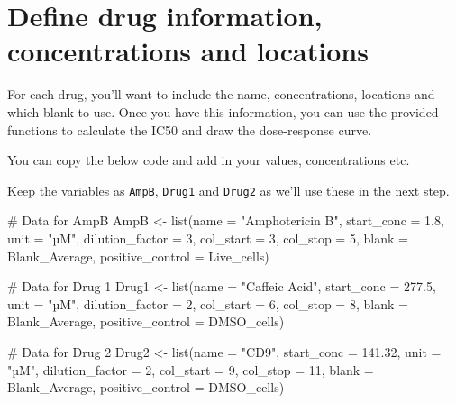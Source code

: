 \documentclass[
  letterpaper,
  DIV=11,
  numbers=noendperiod]{scrreprt}
\newenvironment{Shaded}{\begin{snugshade}}{\end{snugshade}}
\newcommand{\AttributeTok}[1]{\textcolor[rgb]{0.40,0.45,0.13}{#1}}
\newcommand{\CommentTok}[1]{\textcolor[rgb]{0.37,0.37,0.37}{#1}}
\newcommand{\DecValTok}[1]{\textcolor[rgb]{0.68,0.00,0.00}{#1}}
\newcommand{\FloatTok}[1]{\textcolor[rgb]{0.68,0.00,0.00}{#1}}
\newcommand{\FunctionTok}[1]{\textcolor[rgb]{0.28,0.35,0.67}{#1}}
\newcommand{\NormalTok}[1]{\textcolor[rgb]{0.00,0.23,0.31}{#1}}
\newcommand{\OtherTok}[1]{\textcolor[rgb]{0.00,0.23,0.31}{#1}}
\newcommand{\StringTok}[1]{\textcolor[rgb]{0.13,0.47,0.30}{#1}}
\begin{document}

\chapter{Define drug information, concentrations and
locations}\label{define-drug-information-concentrations-and-locations}

For each drug, you'll want to include the name, concentrations,
locations and which blank to use. Once you have this information, you
can use the provided functions to calculate the IC50 and draw the
dose-response curve.

You can copy the below code and add in your values, concentrations etc.

Keep the variables as \texttt{AmpB}, \texttt{Drug1} and \texttt{Drug2}
as we'll use these in the next step.

\begin{Shaded}
\begin{Highlighting}[]
\CommentTok{\# Data for AmpB}
\NormalTok{AmpB }\OtherTok{\textless{}{-}} \FunctionTok{list}\NormalTok{(}\AttributeTok{name =} \StringTok{"Amphotericin B"}\NormalTok{, }
          \AttributeTok{start\_conc =} \FloatTok{1.8}\NormalTok{, }
          \AttributeTok{unit =} \StringTok{"µM"}\NormalTok{,}
          \AttributeTok{dilution\_factor =} \DecValTok{3}\NormalTok{, }
          \AttributeTok{col\_start =} \DecValTok{3}\NormalTok{, }
          \AttributeTok{col\_stop =} \DecValTok{5}\NormalTok{, }
          \AttributeTok{blank =}\NormalTok{ Blank\_Average, }
          \AttributeTok{positive\_control =}\NormalTok{ Live\_cells)}

\CommentTok{\# Data for Drug 1}
\NormalTok{Drug1 }\OtherTok{\textless{}{-}} \FunctionTok{list}\NormalTok{(}\AttributeTok{name =} \StringTok{"Caffeic Acid"}\NormalTok{, }
             \AttributeTok{start\_conc =} \FloatTok{277.5}\NormalTok{, }
             \AttributeTok{unit =} \StringTok{"µM"}\NormalTok{,}
             \AttributeTok{dilution\_factor =} \DecValTok{2}\NormalTok{, }
             \AttributeTok{col\_start =} \DecValTok{6}\NormalTok{, }
             \AttributeTok{col\_stop =} \DecValTok{8}\NormalTok{, }
             \AttributeTok{blank =}\NormalTok{ Blank\_Average, }
             \AttributeTok{positive\_control =}\NormalTok{ DMSO\_cells)}

\CommentTok{\# Data for Drug 2 }
\NormalTok{Drug2 }\OtherTok{\textless{}{-}} \FunctionTok{list}\NormalTok{(}\AttributeTok{name =} \StringTok{"CD9"}\NormalTok{, }
             \AttributeTok{start\_conc =} \FloatTok{141.32}\NormalTok{, }
             \AttributeTok{unit =} \StringTok{"µM"}\NormalTok{,}
             \AttributeTok{dilution\_factor =} \DecValTok{2}\NormalTok{, }
             \AttributeTok{col\_start =} \DecValTok{9}\NormalTok{, }
             \AttributeTok{col\_stop =} \DecValTok{11}\NormalTok{, }
             \AttributeTok{blank =}\NormalTok{ Blank\_Average, }
             \AttributeTok{positive\_control =}\NormalTok{ DMSO\_cells)}
\end{Highlighting}
\end{Shaded}
\end{document}
